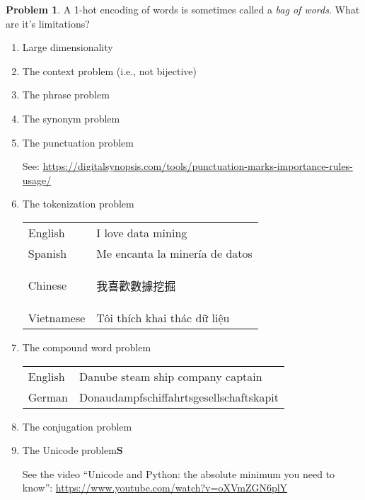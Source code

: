 \documentclass[10pt]{article}
\theoremstyle{definition}
\newtheorem{problem}{Problem}
\begin{document}
\newpage
\begin{problem}
    A 1-hot encoding of words is sometimes called a \emph{bag of words}.
    What are it's limitations?
    \begin{enumerate}
        \item Large dimensionality
            \vspace{3in}
            \newpage
        \item The context problem (i.e., not bijective)
            \vspace{3in}
        \item The phrase problem
            \vspace{3in}
        \item The synonym problem
            \vspace{3in}
        \item The punctuation problem

            See: \url{https://digitalsynopsis.com/tools/punctuation-marks-importance-rules-usage/}
            \vspace{1in}
        \item The tokenization problem

            {
                \renewcommand{\arraystretch}{1.5}
            \begin{tabular}{ll}
                English & I love data mining \\
                Spanish & Me encanta la minería de datos \\
                Chinese & \begin{CJK}{UTF8}{bsmi}我喜歡數據挖掘\end{CJK} \\
                Vietnamese & Tôi thích khai thác dữ liệu \\
            \end{tabular}
            }
            \vspace{1in}
        \item The compound word problem

            {
                \renewcommand{\arraystretch}{1.5}
            \begin{tabular}{ll}
                English & Danube steam ship company captain \\
                German & Donaudampfschiffahrtsgesellschaftskapit \\
            \end{tabular}
            }
            \vspace{1in}
        \item The conjugation problem
            \vspace{2in}
        \item The Unicode problem\textbf{S}
            
            See the video ``Unicode and Python: the absolute minimum you need to know'': \url{https://www.youtube.com/watch?v=oXVmZGN6plY}
    \end{enumerate}
\end{problem}
\end{document}
